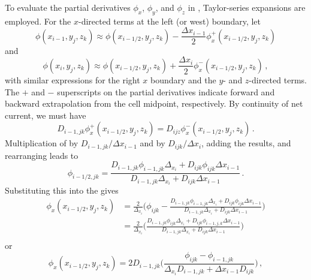 To evaluate the partial derivatives $\phi_x$, $\phi_y$, and $\phi_z$ in 
, Taylor-series expansions are 
employed. For the
$x$-directed terms at the left (or west) boundary, let
\begin{equation}
  \phi(x_{i-1},y_j,z_k)  \approx 
      \phi(x_{i-1/2},y_j,z_k) - 
      \frac{\Delta x_{i-1}}{2} \phi^+_x (x_{i-1/2},y_j,z_k) 
 \label{eq:leftXexpA} 
\end{equation}
and
\begin{equation}
  \phi(x_{i},y_j,z_k)    \approx 
      \phi(x_{i-1/2},y_j,z_k) + 
      \frac{\Delta x_{i}}{2} \phi^-_x (x_{i-1/2},y_j,z_k) \, ,
 \label{eq:leftXexpB}
\end{equation}
with similar expressions for the right $x$ boundary and the 
$y$- and $z$-directed terms.  The $+$ and $-$ superscripts
on the partial derivatives indicate forward and backward extrapolation
from the cell midpoint,
respectively.
By continuity of net current, we must have
\begin{equation}
   D_{i-1,jk}\phi^+_x(x_{i-1/2},y_j,z_k) 
     = D_{ijz}\phi^-_x(x_{i-1/2},y_j,z_k) \, .
 \label{eq:contcurr}
\end{equation}
Multiplication of  by 
$D_{i-1,jk}/\Delta x_{i-1}$ and
 by $D_{ijk}/\Delta x_{i}$,
adding the results, and rearranging leads to
\begin{equation}
 \phi_{i-1/2,jk} = 
   \frac{D_{i-1,jk} \phi_{i-1,jk} \Delta_{x_i} + 
             D_{ijk} \phi_{ijk} \Delta x_{i-1}}
        {D_{i-1,jk} \Delta_{x_i} + D_{ijk} \Delta x_{i-1}} \, .
\end{equation}
Substituting this into the  gives
\begin{equation}
\begin{split}
 \phi_x(x_{i-1/2},y_j,z_k) &= 
  \frac{2}{\Delta_{x_i}} 
    \Bigg (\phi_{ijk} - 
           \frac{D_{i-1,jk} \phi_{i-1,jk} \Delta_{x_i} + 
                     D_{ijk} \phi_{ijk} \Delta x_{i-1}}
                {D_{i-1,jk} \Delta_{x_i} + D_{ijk} \Delta x_{i-1}} 
    \Bigg ) \\
  &= \frac{2}{\Delta_{x_i}} 
     \Bigg ( \frac{D_{i-1,jk} \phi_{ijk} \Delta_{x_i} + 
                       D_{ijk} \phi_{i-1,j,k} \Delta x_{i-1}}
                  {D_{i-1,jk}  \Delta_{x_i} + 
                       D_{ijk} \Delta x_{i-1}} \Bigg ) \\  
\end{split}
\end{equation}
or
\begin{equation}
  \phi_x(x_{i-1/2},y_j,z_k) = 
    2D_{i-1,jk} \Bigg ( \frac{\phi_{ijk} - \phi_{i-1,jk}} 
                             {\Delta_{x_i} D_{i-1,jk} + 
                              \Delta x_{i-1} D_{ijk}} 
                \Bigg ) \, ,  
\label{eq:phideriv1}
\end{equation}
